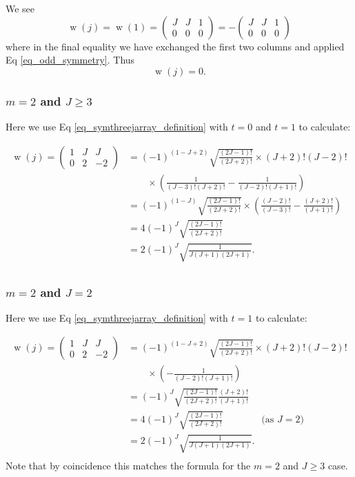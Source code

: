 \documentclass[11pt]{article}
\newcommand{\symthreejarray}[6]{{\left( \begin{array}{ccc} #1 & #2 & #3 \\ #4 & #5 & #6 \end{array} \right)} }
\DeclareMathOperator{\threej}{w}
\begin{document}
We see
\begin{equation}
\threej(j) = \threej(1) = \symthreejarray{J}{J}{1}{0}{0}{0} = -\symthreejarray{J}{J}{1}{0}{0}{0}
\end{equation}
where in the final equality we have exchanged the first two columns and applied Eq \ref{eq_odd_symmetry}. Thus
\begin{equation}
\label{eq_second_m_zero_value}
\threej(j) = 0.
\end{equation}

\subsubsection{$m=2$ and $J \ge 3$}

Here we use Eq \ref{eq_symthreejarray_definition} with $t=0$ and $t=1$ to calculate:

\begin{equation}
\begin{split}
\threej(j) = \symthreejarray{1}{J}{J}{0}{2}{-2} &= (-1)^{(1-J+2)} \sqrt{\frac{(2J-1)!}{(2J+2)!}} \times (J+2)! (J-2)! \\
&\qquad \times \left( \frac{1}{(J-3)! (J+2)!} - \frac{1}{(J-2)! (J+1)!} \right) \\
&= (-1)^{(1-J)} \sqrt{\frac{(2J-1)!}{(2J+2)!}} \times \left( \frac{(J-2)!}{(J-3)!} - \frac{(J+2)!}{(J+1)!} \right) \\
&= 4 (-1)^{J} \sqrt{\frac{(2J-1)!}{(2J+2)!}} \\
&= 2 (-1)^{J} \sqrt{\frac{1}{J(J+1)(2J+1)}}. \\
\end{split}
\end{equation}

\subsubsection{$m=2$ and $J = 2$}

Here we use Eq \ref{eq_symthreejarray_definition} with $t=1$ to calculate:

\begin{equation}
\begin{split}
\threej(j) = \symthreejarray{1}{J}{J}{0}{2}{-2} &= (-1)^{(1-J+2)} \sqrt{\frac{(2J-1)!}{(2J+2)!}} \times (J+2)! (J-2)! \\
&\qquad \times \left( - \frac{1}{(J-2)! (J+1)!} \right) \\
&= (-1)^{J} \sqrt{\frac{(2J-1)!}{(2J+2)!}} \frac{(J+2)!}{(J+1)!} \\
&= 4 (-1)^{J} \sqrt{\frac{(2J-1)!}{(2J+2)!}}  \qquad \qquad \textrm{(as $J=2$)}\\
&= 2 (-1)^{J} \sqrt{\frac{1}{J(J+1)(2J+1)}}. \\
\end{split}
\end{equation}
Note that by coincidence this matches the formula for the $m=2$ and $J \ge 3$ case.
\end{document}
